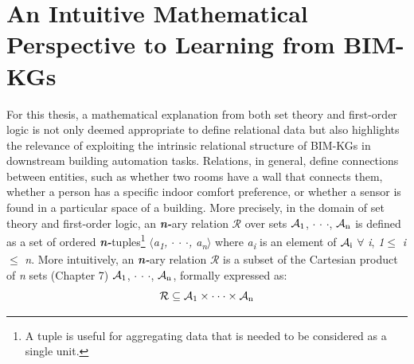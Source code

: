 \section{An Intuitive Mathematical Perspective to Learning from \acp{BIM-KG}}
\label{learning in LBD domains}

For this thesis, a mathematical explanation from both set theory and first-order logic is not only deemed appropriate to define relational data but also highlights the relevance of exploiting the intrinsic relational structure of \acp{BIM-KG} in downstream building automation tasks. Relations, in general, define connections between entities, such as whether two rooms have a wall that connects them, whether a person has a specific indoor comfort preference, or whether a sensor is found in a particular space of a building. More precisely, in the domain of set theory and first-order logic, an \textbf{\textit{n-}}ary relation $\mathcal{R}$ over sets $\mathcal{A\textsubscript{1}}$, $\cdot$ $\cdot$ $\cdot$, $\mathcal{A\textsubscript{n}}$ is defined as a set of ordered \textbf{\textit{n-}}tuples\footnote{A tuple is useful for aggregating data that is needed to be considered as a single unit.} $\langle$\textit{a\textsubscript{1}, $\cdot$ $\cdot$ $\cdot$, a\textsubscript{n}}$\rangle$ where \textit{a\textsubscript{i}} is an element of $\mathcal{A\textsubscript{i}}$ $\forall$ \textit{i}, \textit{1}$\leqslant$ \textit{i} $\leqslant$ \textit{n}. More intuitively, an \textbf{\textit{n-}}ary relation $\mathcal{R}$ is a subset of the Cartesian product of \textit{n} sets \citep{Halmos1974NaiveTheory} (Chapter 7) $\mathcal{A\textsubscript{1}}$, $\cdot$ $\cdot$ $\cdot$, $\mathcal{A\textsubscript{n}}$, formally expressed as:
\begin{equation}
    \mathcal{R} \subseteq \mathcal{A\textsubscript{1}} \times \cdot \cdot \cdot \times \mathcal{A\textsubscript{n}}
\end{equation}
